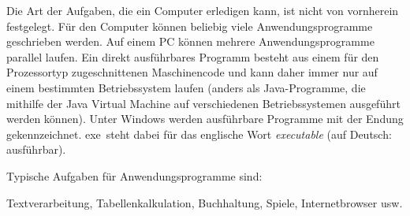Die Art der Aufgaben, die ein Computer erledigen kann, ist nicht von
vornherein festgelegt. Für den Computer können beliebig viele
Anwendungsprogramme geschrieben werden. Auf einem PC können mehrere
Anwendungsprogramme parallel laufen. Ein direkt ausführbares Programm besteht
aus einem für den Prozessortyp zugeschnittenen Maschinencode und kann daher
immer nur auf einem bestimmten Betriebssystem laufen (anders als
Java-Programme, die mithilfe der Java Virtual Machine auf verschiedenen
Betriebssystemen ausgeführt werden können). Unter Windows werden ausführbare
Programme mit der Endung  gekennzeichnet. \glqq exe\grqq\ steht
dabei für das englische Wort \emph{executable} (auf Deutsch: ausführbar).

Typische Aufgaben für Anwendungsprogramme sind:

Textverarbeitung, Tabellenkalkulation, Buchhaltung, Spiele, Internetbrowser
usw.
